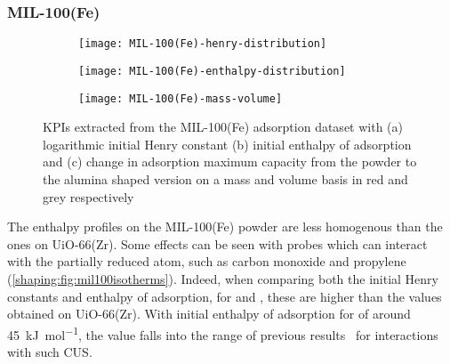 
\subsubsection{MIL-100(Fe)}

\begin{figure}[p]
	\centering
	\begin{subfigure}{\linewidth}
		\parbox[c]{0.1\linewidth}{\caption{}%
			\label{shaping:fig:analysismil100henry}}%
		\parbox[b]{0.8\linewidth}{%
			\texttt{[image: MIL-100(Fe)-henry-distribution]}%
		}%
	\end{subfigure}%

	\begin{subfigure}{\linewidth}
		\parbox[c]{0.1\linewidth}{\caption{}%
			\label{shaping:fig:analysismil100enth}}%
		\parbox[b]{0.8\linewidth}{%
			\texttt{[image: MIL-100(Fe)-enthalpy-distribution]}%
		}%
	\end{subfigure}%

	\begin{subfigure}{\linewidth}
		\parbox[c]{0.1\linewidth}{\caption{}%
			\label{shaping:fig:analysismil100basis}}%
		\parbox[b]{0.8\linewidth}{%
			\texttt{[image: MIL-100(Fe)-mass-volume]}%
		}%
	\end{subfigure}%

	\caption{\glspl{KPI} extracted from the MIL-100(Fe) adsorption dataset with
		(a) logarithmic initial Henry constant (b) initial enthalpy of
		adsorption and (c) change in adsorption maximum capacity from the powder
		to the alumina shaped version on a mass and volume basis in red and grey
		respectively}%
	\label{shaping:fig:analysismil100}
\end{figure}

The enthalpy profiles on the MIL-100(Fe) powder are less homogenous
than the ones on UiO-66(Zr). Some effects can be seen with probes which
can interact with the partially reduced  atom, such as
carbon monoxide and propylene (\autoref{shaping:fig:mil100isotherms}).
Indeed, when comparing both the initial Henry constants and
enthalpy of adsorption, for  and , these are
higher than the values obtained on UiO-66(Zr).
With initial enthalpy of adsorption for  of around
\SI{45}{\kilo\joule\per\mol}, the value falls into the range of
previous results~\cite{yoonControlledReducibilityMetalOrganic2010}
for interactions with such  \gls{CUS}.

